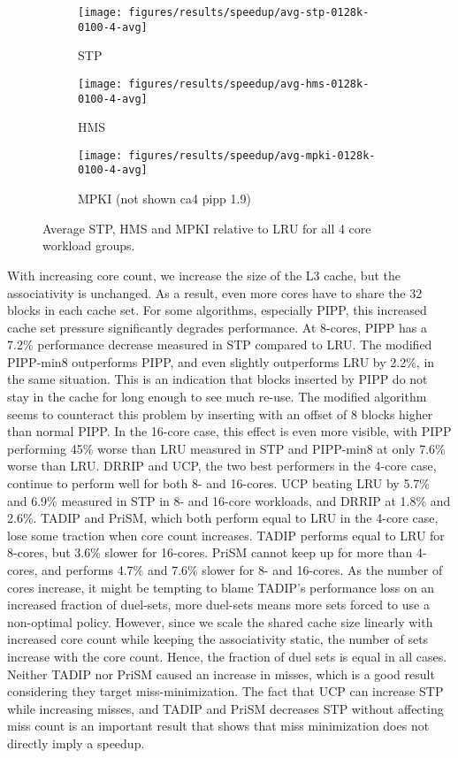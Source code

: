 \begin{figure}[th]
    \centering
    \begin{subfigure}[b]{0.6\textwidth}
        \texttt{[image: figures/results/speedup/avg-stp-0128k-0100-4-avg]}
        \caption{STP}
        \label{fig:results:base:4-avg:stp}
    \end{subfigure}
    \begin{subfigure}[b]{0.6\textwidth}
        \texttt{[image: figures/results/speedup/avg-hms-0128k-0100-4-avg]}
        \caption{HMS}
        \label{fig:results:base:4-avg:hms}
    \end{subfigure}
    \begin{subfigure}[b]{0.6\textwidth}
        \texttt{[image: figures/results/speedup/avg-mpki-0128k-0100-4-avg]}
        \caption{MPKI (not shown ca4 pipp 1.9)}
        \label{fig:results:base:4-avg:mpki}
    \end{subfigure}
    \caption{Average STP, HMS and MPKI relative to LRU for all 4 core workload groups.}
    \label{fig:results:base:4-avg} 
\end{figure}


With increasing core count, we increase the size of the L3 cache, but the associativity is unchanged.
As a result, even more cores have to share the 32 blocks in each cache set.
For some algorithms, especially PIPP, this increased cache set pressure significantly degrades performance.
At 8-cores, PIPP has a 7.2\% performance decrease measured in STP compared to LRU.
The modified PIPP-min8 outperforms PIPP, and even slightly outperforms LRU by 2.2\%, in the same situation.
This is an indication that blocks inserted by PIPP do not stay in the cache for long enough to see much re-use.
The modified algorithm seems to counteract this problem by inserting with an offset of 8 blocks higher than normal PIPP.
In the 16-core case, this effect is even more visible, with PIPP performing 45\% worse than LRU measured in STP and PIPP-min8 at only 7.6\% worse than LRU.
DRRIP and UCP, the two best performers in the 4-core case, continue to perform well for both 8- and 16-cores.
UCP beating LRU by 5.7\% and 6.9\% measured in STP in 8- and 16-core workloads, and DRRIP at 1.8\% and 2.6\%.
TADIP and PriSM, which both perform equal to LRU in the 4-core case, lose some traction when core count increases.
TADIP performs equal to LRU for 8-cores, but 3.6\% slower for 16-cores.
PriSM cannot keep up for more than 4-cores, and performs 4.7\% and 7.6\% slower for 8- and 16-cores.
As the number of cores increase, it might be tempting to blame TADIP's performance loss on an increased fraction of duel-sets, more duel-sets means more sets forced to use a non-optimal policy.
However, since we scale the shared cache size linearly with increased core count while keeping the associativity static, the number of sets increase with the core count.
Hence, the fraction of duel sets is equal in all cases.
Neither TADIP nor PriSM caused an increase in misses, which is a good result considering they target miss-minimization.
The fact that UCP can increase STP while increasing misses, and TADIP and PriSM decreases STP without affecting miss count is an important result that shows that miss minimization does not directly imply a speedup.

